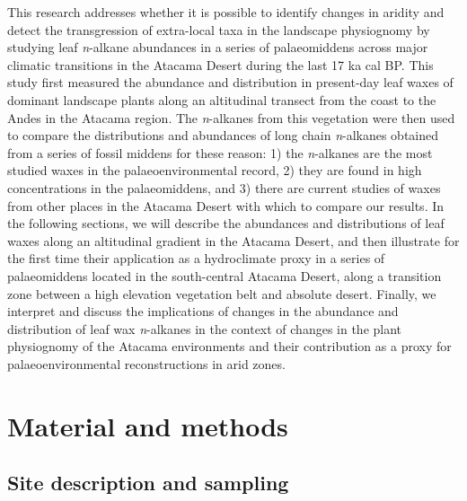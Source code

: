 \documentclass[
  authoryear,
  preprint,
  3p]{elsarticle}
\begin{document}
This research addresses whether it is possible to identify changes in
aridity and detect the transgression of extra-local taxa in the
landscape physiognomy by studying leaf \emph{n}-alkane abundances in a
series of palaeomiddens across major climatic transitions in the Atacama
Desert during the last 17 ka cal BP. This study first measured the
abundance and distribution in present-day leaf waxes of dominant
landscape plants along an altitudinal transect from the coast to the
Andes in the Atacama region. The \emph{n}-alkanes from this vegetation
were then used to compare the distributions and abundances of long chain
\emph{n}-alkanes obtained from a series of fossil middens for these
reason: 1) the \emph{n}-alkanes are the most studied waxes in the
palaeoenvironmental record, 2) they are found in high concentrations in
the palaeomiddens, and 3) there are current studies of waxes from other
places in the Atacama Desert with which to compare our results. In the
following sections, we will describe the abundances and distributions of
leaf waxes along an altitudinal gradient in the Atacama Desert, and then
illustrate for the first time their application as a hydroclimate proxy
in a series of palaeomiddens located in the south-central Atacama
Desert, along a transition zone between a high elevation vegetation belt
and absolute desert. Finally, we interpret and discuss the implications
of changes in the abundance and distribution of leaf wax
\emph{n}-alkanes in the context of changes in the plant physiognomy of
the Atacama environments and their contribution as a proxy for
palaeoenvironmental reconstructions in arid zones.

\hypertarget{material-and-methods}{%
\section{Material and methods}\label{material-and-methods}}

\hypertarget{site-description-and-sampling}{%
\subsection{Site description and
sampling}\label{site-description-and-sampling}}
\end{document}
